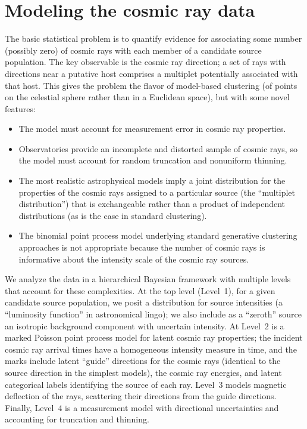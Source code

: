 \section{Modeling the cosmic ray data}


The basic statistical problem is to quantify evidence for associating some
number (possibly zero) of cosmic rays with each member of a candidate
source population.  The key observable is the cosmic ray direction; a set of
rays with directions near a putative host comprises a multiplet potentially
associated with that host.  This gives the problem the flavor of model-based
clustering (of points on the celestial sphere rather than in a Euclidean space),
but with some novel features:
\begin{itemize}
\item The model must account for measurement error in cosmic ray properties.

\item Observatories provide an incomplete and distorted sample of cosmic rays,
so the model must account for random truncation and nonuniform thinning.

\item The most realistic astrophysical models imply a joint distribution for
the properties of the cosmic rays assigned to a particular source (the
``multiplet distribution'') that is exchangeable rather than a product of
independent distributions (as is the case in standard clustering).

\item The binomial point process model underlying standard generative
clustering approaches is not appropriate because the number of cosmic rays
is informative about the intensity scale of the cosmic ray sources.
\end{itemize}

We analyze the data in a hierarchical Bayesian framework with
multiple levels that account for these complexities.  At the top level
(Level~1), for a given candidate source population, we posit a distribution
for source intensities (a ``luminosity function'' in astronomical lingo);
we also include as a ``zeroth'' source an isotropic background component
with uncertain intensity.  At Level~2 is a marked Poisson point process
model for latent cosmic ray properties; the incident cosmic ray arrival
times have a homogeneous intensity measure in time, and the marks include
latent ``guide'' directions for the cosmic rays (identical to the
source direction in the simplest models), the cosmic ray energies,
and latent categorical labels identifying the source of each ray.  Level~3
models magnetic deflection of the rays, scattering their directions from the
guide directions.  Finally, Level~4 is a measurement model with directional
uncertainties and accounting for truncation and thinning.

